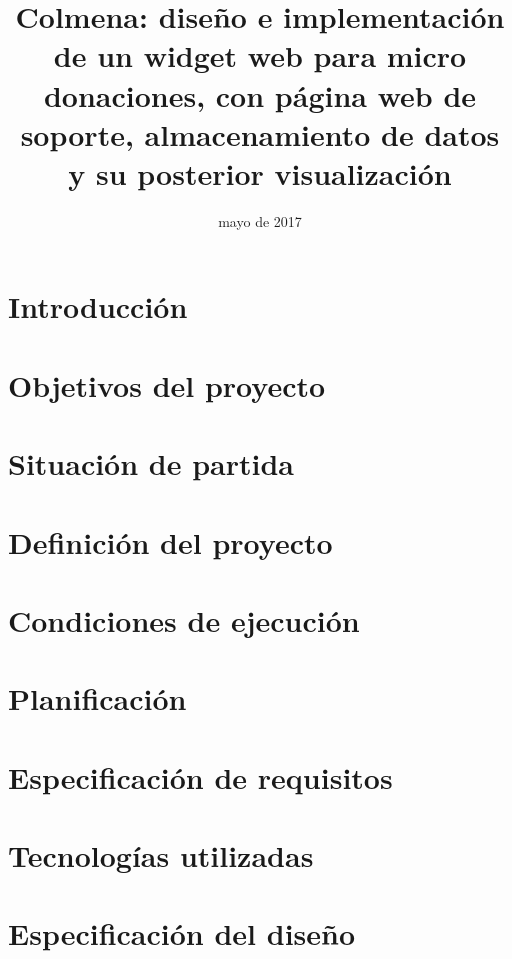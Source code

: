 \documentclass{memoriaPFC}
\title{Colmena: diseño e implementación de un widget web para micro donaciones, con página web de soporte, almacenamiento de datos y su posterior visualización}
\date{mayo de 2017}
\begin{document}
\frontmatter
\hacerportada
\hacerresumen
\tableofcontents
\listoffigures %
\listoftables %

\mainmatter
\chapter{Introducción}



\chapter{Objetivos del proyecto}



\chapter{Situación de partida}



\chapter{Definición del proyecto}



\chapter{Condiciones de ejecución}



\chapter{Planificación}



\chapter{Especificación de requisitos}



\chapter{Tecnologías utilizadas}



\chapter{Especificación del diseño}



\backmatter
\appendix

%

\end{document}
